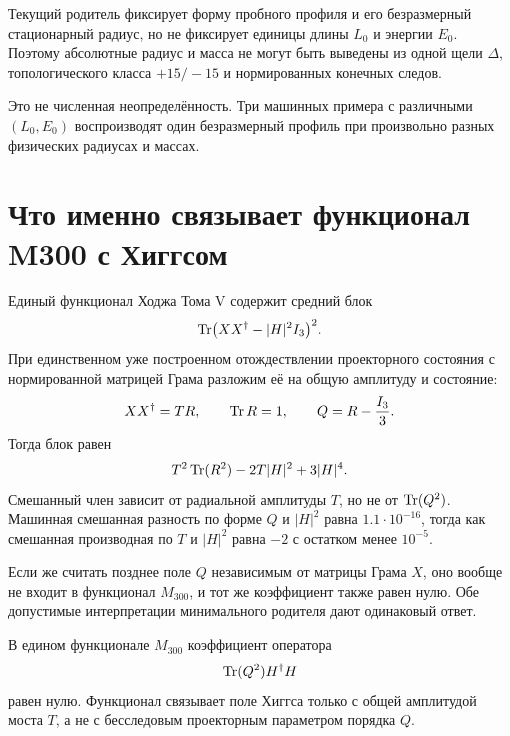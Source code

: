 \begin{theorem}
Текущий родитель фиксирует форму пробного профиля и его безразмерный
стационарный радиус, но не фиксирует единицы длины $L_0$ и энергии $E_0$.
Поэтому абсолютные радиус и масса не могут быть выведены из одной щели
$\Delta$, топологического класса $+15/-15$ и нормированных конечных следов.
\end{theorem}

Это не численная неопределённость. Три машинных примера с различными
$(L_0,E_0)$ воспроизводят один безразмерный профиль при произвольно разных
физических радиусах и массах.

\section{Что именно связывает функционал M300 с Хиггсом}

Единый функционал Ходжа Тома V содержит средний блок
\begin{equation}
 \operatorname{Tr}\bigl(XX^\dagger-|H|^2I_3\bigr)^2.
\end{equation}
При единственном уже построенном отождествлении проекторного состояния с
нормированной матрицей Грама разложим её на общую амплитуду и состояние:
\begin{equation}
 XX^\dagger=TR,
 \qquad \operatorname{Tr} R=1,
 \qquad Q=R-\frac{I_3}{3}.
\end{equation}
Тогда блок равен
\begin{equation}
 T^2\operatorname{Tr}(R^2)-2T|H|^2+3|H|^4.
 \label{eq:v6-m300-radial-higgs-only}
\end{equation}
Смешанный член зависит от радиальной амплитуды $T$, но не от
$\operatorname{Tr}(Q^2)$. Машинная смешанная разность по форме $Q$ и $|H|^2$ равна
$1.1\cdot10^{-16}$, тогда как смешанная производная по $T$ и $|H|^2$
равна $-2$ с остатком менее $10^{-5}$.

Если же считать позднее поле $Q$ независимым от матрицы Грама $X$, оно
вообще не входит в функционал $M_{300}$, и тот же коэффициент также равен
нулю. Обе допустимые интерпретации минимального родителя дают одинаковый
ответ.

\begin{theorem}
В едином функционале $M_{300}$ коэффициент оператора
\begin{equation}
 \operatorname{Tr}(Q^2)H^\dagger H
\end{equation}
равен нулю. Функционал связывает поле Хиггса только с общей амплитудой
моста $T$, а не с бесследовым проекторным параметром порядка $Q$.
\end{theorem}

